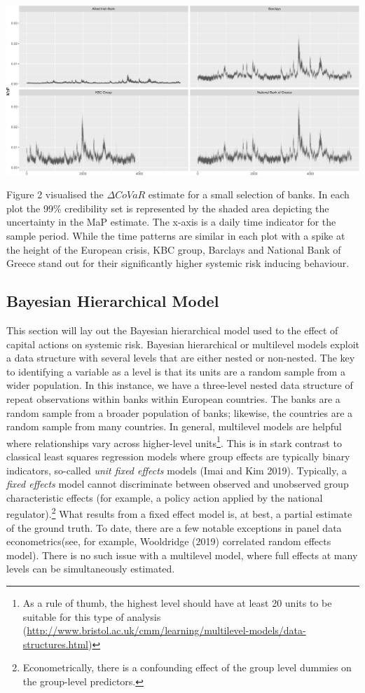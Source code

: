 \documentclass[
  10pt,
]{article}
\begin{document}
\includegraphics{figures/paper-build graphs-1}

Figure 2 visualised the \(\Delta CoVaR\) estimate for a small selection
of banks. In each plot the 99\% credibility set is represented by the
shaded area depicting the uncertainty in the MaP estimate. The x-axis is
a daily time indicator for the sample period. While the time patterns
are similar in each plot with a spike at the height of the European
crisis, KBC group, Barclays and National Bank of Greece stand out for
their significantly higher systemic risk inducing behaviour.

\hypertarget{bayesian-hierarchical-model}{%
\subsection{Bayesian Hierarchical
Model}\label{bayesian-hierarchical-model}}

This section will lay out the Bayesian hierarchical model used to the
effect of capital actions on systemic risk. Bayesian hierarchical or
multilevel models exploit a data structure with several levels that are
either nested or non-nested. The key to identifying a variable as a
level is that its units are a random sample from a wider population. In
this instance, we have a three-level nested data structure of repeat
observations within banks within European countries. The banks are a
random sample from a broader population of banks; likewise, the
countries are a random sample from many countries. In general,
multilevel models are helpful where relationships vary across
higher-level units\footnote{As a rule of thumb, the highest level should
  have at least 20 units to be suitable for this type of analysis
  (\url{http://www.bristol.ac.uk/cmm/learning/multilevel-models/data-structures.html})}.
This is in stark contrast to classical least squares regression models
where group effects are typically binary indicators, so-called
\emph{unit fixed effects} models (Imai and Kim 2019). Typically, a
\emph{fixed effects} model cannot discriminate between observed and
unobserved group characteristic effects (for example, a policy action
applied by the national regulator).\footnote{Econometrically, there is a
  confounding effect of the group level dummies on the group-level
  predictors.} What results from a fixed effect model is, at best, a
partial estimate of the ground truth. To date, there are a few notable
exceptions in panel data econometrics(see, for example, Wooldridge
(2019) correlated random effects model). There is no such issue with a
multilevel model, where full effects at many levels can be
simultaneously estimated.
\end{document}
